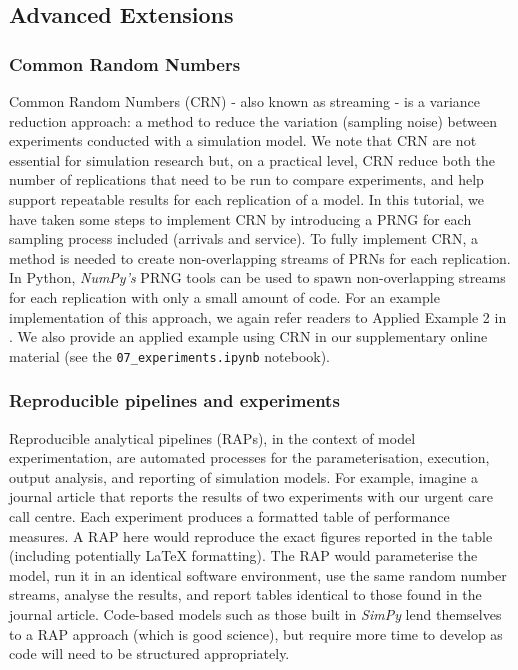 \documentclass{swpaperproc}
\theoremstyle{sw}
\begin{document}
\subsection{Advanced Extensions}

\subsubsection{Common Random Numbers}
\label{subsubsec:crn}

Common Random Numbers (CRN) - also known as streaming - is a variance reduction approach: a method to reduce the variation (sampling noise) between experiments conducted with a simulation model. We note that CRN are not essential for simulation research but, on a practical level, CRN reduce both the number of replications that need to be run to compare experiments, and help support repeatable results for each replication of a model.  In this tutorial, we have taken some steps to implement CRN by introducing a PRNG for each sampling process included (arrivals and service). To fully implement CRN, a method is needed to create non-overlapping streams of PRNs for each replication.  In Python, \textit{NumPy's} PRNG tools can be used to spawn non-overlapping streams for each replication with only a small amount of code.  For an example implementation of this approach, we again refer readers to Applied Example 2 in . We also provide an applied example using CRN in our supplementary online material (see the \verb|07_experiments.ipynb| notebook).

\subsubsection{Reproducible pipelines and experiments}

Reproducible analytical pipelines (RAPs), in the context of model experimentation, are automated processes for the parameterisation, execution, output analysis, and reporting of simulation models. For example, imagine a journal article that reports the results of two experiments with our urgent care call centre. Each experiment produces a formatted table of performance measures. A RAP here  would reproduce the exact figures reported in the table (including potentially LaTeX formatting). The RAP would parameterise the model, run it in an identical software environment, use the same random number streams, analyse the results, and report tables identical to those found in the journal article. Code-based models such as those built in \textit{SimPy} lend themselves to a RAP approach (which is good science), but require more time to develop as code will need to be structured appropriately.
\end{document}
